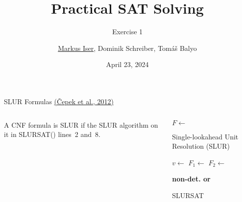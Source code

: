 \documentclass[t]{sdqbeamer}
\title[SAT Solving]{Practical SAT Solving}
\subtitle{Exercise 1}
\author{\underline{Markus Iser}, Dominik Schreiber, Tom\'a\v{s} Balyo}
\date{April 23, 2024}
\begin{document}
\begin{frame}
	\thispagestyle{empty}
	\titlepage
\end{frame}

\begin{frame}{SLUR Formulas \href{https://doi.org/10.1007/978-3-642-27660-6_15}{(Čepek et al., 2012)}}
	\setlength\columnsep{1ex}
	\begin{columns}
		\begin{column}{.3\linewidth}
			A CNF formula is SLUR if the SLUR algorithm  on it  in SLURSAT() lines~2 and~8.\\[1ex]

			
		\end{column}
		\begin{column}{.6\linewidth}
			\vspace*{-3ex}
			\renewcommand{\thealgocf}{} %

			\LinesNotNumbered
			\begin{algorithm}[H]
				\DontPrintSemicolon
				$F \leftarrow$  \;
				 {
					\Return \UNSAT
				}
				\caption{Single-lookahead Unit Resolution (SLUR)}
			\end{algorithm}

			\LinesNumbered
			\begin{algorithm}[H]
				\DontPrintSemicolon

				
				 {
					\Return \SAT
				}

				$v \leftarrow$  
				$F_1 \leftarrow$  \;
				$F_2 \leftarrow$  \;

				 {
					\Return \GIVEUP
				}
				 {
					\Return {}
				}
				 {
					\Return {}
				}
				\Return {} \textbf{non-det. or}  

				\caption{SLURSAT}
			\end{algorithm}
		\end{column}
	\end{columns}
\end{frame}
\end{document}
